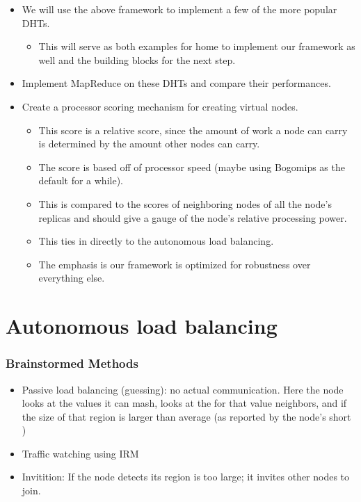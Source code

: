 \begin{itemize}
	
	\item We will use the above framework to implement a few of the more popular DHTs.
	\begin{itemize}
		\item This will serve as both examples for home to implement our framework as well and the building blocks for the next step.
	\end{itemize}
	\item Implement MapReduce on these DHTs and compare their performances.
	\item Create a  processor scoring mechanism for creating virtual nodes.
	\begin{itemize}
		\item This score is a relative score, since the amount of work a node can carry is determined by the amount other nodes can carry.
		\item The score is based off of processor speed (maybe using Bogomips as the default for a while).
		\item This is compared to the scores of neighboring nodes  of all the node's replicas and should give a gauge of the node's relative processing power.
		\item This ties in directly to the autonomous load balancing.
	\end{itemize}
	\begin{itemize}
		\item The emphasis is our framework is optimized for robustness over everything else.
	\end{itemize}
	
\end{itemize}



\section{Autonomous load balancing}



\subsubsection{Brainstormed Methods}
\begin{itemize}
	\item Passive load balancing (guessing):  no actual communication.
	Here the node looks at the values it can mash, looks at the for that value neighbors, and if the size of that region is larger than average (as reported by the node's short )
	\item Traffic watching using IRM
	\item Invitition:  If the node detects its region is too large; it invites other nodes to join.
\end{itemize}

